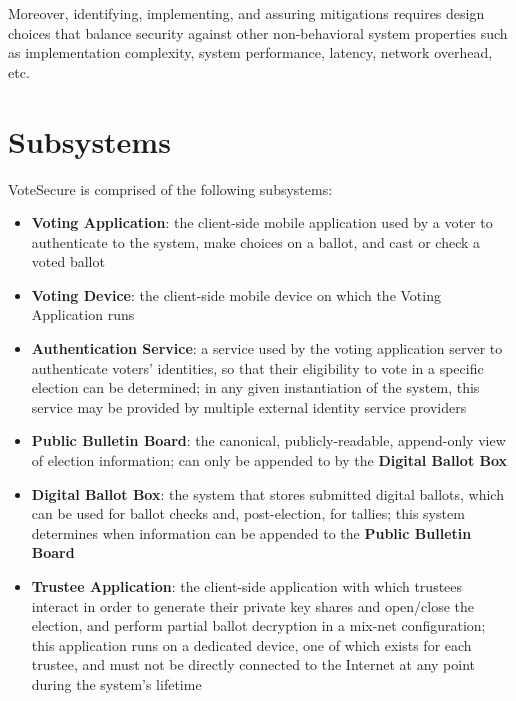 \documentclass[10pt,letterpaper]{article}
\begin{document}
Moreover, identifying, implementing, and assuring mitigations requires design choices that balance security against other non-behavioral system properties such as implementation complexity, system performance, latency, network overhead, etc.

\pagebreak
\section{Subsystems}

VoteSecure is comprised of the following subsystems:

\begin{itemize}

    \item \textbf{Voting Application}: the client-side mobile application used by a voter to authenticate to the system, make choices on a ballot, and cast or check a voted ballot

    \item \textbf{Voting Device}: the client-side mobile device on which the Voting Application runs

    \item \textbf{Authentication Service}: a service used by the voting application server to authenticate voters' identities, so that their eligibility to vote in a specific election can be determined; in any given instantiation of the system, this service may be provided by multiple external identity service providers

    \item \textbf{Public Bulletin Board}: the canonical, publicly-readable, append-only view of election information; can only be appended to by the \textbf{Digital Ballot Box}

    \item \textbf{Digital Ballot Box}: the system that stores submitted digital ballots, which can be used for ballot checks and, post-election, for tallies; this system determines when information can be appended to the \textbf{Public Bulletin Board}

    \item \textbf{Trustee Application}: the client-side application with which trustees interact in order to generate their private key shares and open/close the election, and perform partial ballot decryption in a mix-net configuration; this application runs on a dedicated device, one of which exists for each trustee, and must not be directly connected to the Internet at any point during the system's lifetime


\end{itemize}
\end{document}
